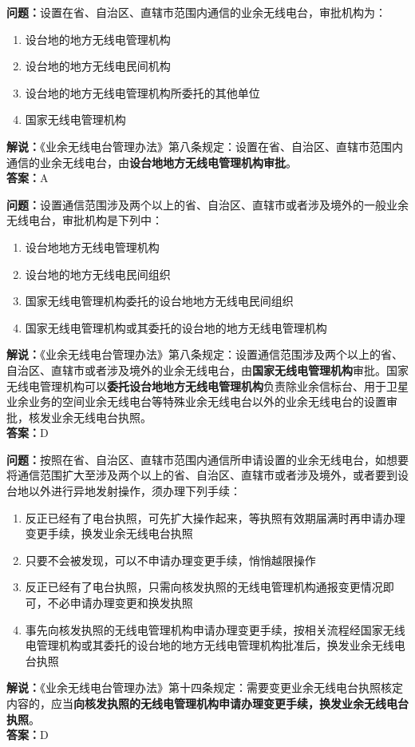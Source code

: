 \bigskip


\noindent\textbf{问题：}设置在省、自治区、直辖市范围内通信的业余无线电台，审批机构为：
\begin{enumerate}[label=\Alph*), leftmargin=3em]
	\item 设台地的地方无线电管理机构
	\item 设台地的地方无线电民间机构
	\item 设台地的地方无线电管理机构所委托的其他单位
	\item 国家无线电管理机构
\end{enumerate}
\noindent\textbf{解说：}《业余无线电台管理办法》第八条规定：设置在省、自治区、直辖市范围内通信的业余无线电台，由\textbf{设台地地方无线电管理机构审批}。\\\noindent\textbf{答案：}A


\bigskip


\noindent\textbf{问题：}设置通信范围涉及两个以上的省、自治区、直辖市或者涉及境外的一般业余无线电台，审批机构是下列中：
\begin{enumerate}[label=\Alph*), leftmargin=3em]
	\item 设台地地方无线电管理机构
	\item 设台地的地方无线电民间组织
	\item 国家无线电管理机构委托的设台地地方无线电民间组织
	\item 国家无线电管理机构或其委托的设台地的地方无线电管理机构
\end{enumerate}
\noindent\textbf{解说：}《业余无线电台管理办法》第八条规定：设置通信范围涉及两个以上的省、自治区、直辖市或者涉及境外的业余无线电台，由\textbf{国家无线电管理机构}审批。国家无线电管理机构可以\textbf{委托设台地地方无线电管理机构}负责除业余信标台、用于卫星业余业务的空间业余无线电台等特殊业余无线电台以外的业余无线电台的设置审批，核发业余无线电台执照。 \\\noindent\textbf{答案：}D


\bigskip


\noindent\textbf{问题：}按照在省、自治区、直辖市范围内通信所申请设置的业余无线电台，如想要将通信范围扩大至涉及两个以上的省、自治区、直辖市或者涉及境外，或者要到设台地以外进行异地发射操作，须办理下列手续：
\begin{enumerate}[label=\Alph*), leftmargin=3em]
	\item 反正已经有了电台执照，可先扩大操作起来，等执照有效期届满时再申请办理变更手续，换发业余无线电台执照
	\item 只要不会被发现，可以不申请办理变更手续，悄悄越限操作
	\item 反正已经有了电台执照，只需向核发执照的无线电管理机构通报变更情况即可，不必申请办理变更和换发执照
	\item 事先向核发执照的无线电管理机构申请办理变更手续，按相关流程经国家无线电管理机构或其委托的设台地的地方无线电管理机构批准后，换发业余无线电台执照
\end{enumerate}
\noindent\textbf{解说：}《业余无线电台管理办法》第十四条规定：需要变更业余无线电台执照核定内容的，应当\textbf{向核发执照的无线电管理机构申请办理变更手续，换发业余无线电台执照}。\\\noindent\textbf{答案：}D



